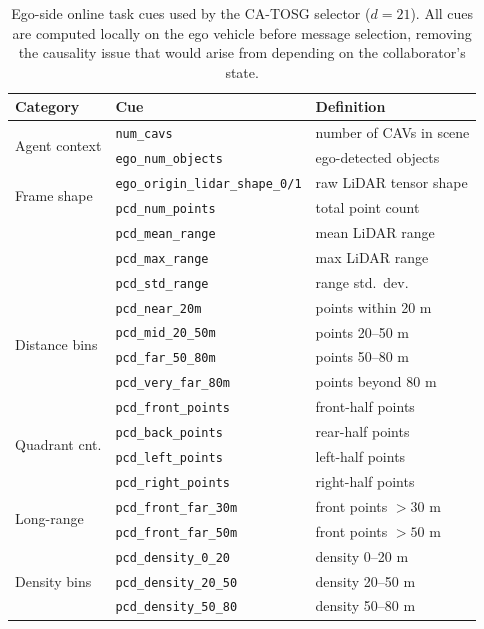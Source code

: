 \documentclass[journal]{IEEEtran}
\newcommand{\method}{CA-TOSG}
\begin{document}
\begin{table}[t]
\centering
\caption{Ego-side online task cues used by the \method{} selector ($d=21$). All cues are computed locally on the ego vehicle before message selection, removing the causality issue that would arise from depending on the collaborator's state.}
\label{tab:cues}
\begin{tabular}{lll}
\toprule
Category & Cue & Definition \\
\midrule
\multirow{2}{*}{Agent context} & \texttt{num\_cavs} & number of CAVs in scene \\
                               & \texttt{ego\_num\_objects} & ego-detected objects \\
\midrule
\multirow{2}{*}{Frame shape}   & \texttt{ego\_origin\_lidar\_shape\_0/1} & raw LiDAR tensor shape \\
\midrule
\multirow{4}{*}{Range stats}   & \texttt{pcd\_num\_points} & total point count \\
                               & \texttt{pcd\_mean\_range}    & mean LiDAR range \\
                               & \texttt{pcd\_max\_range}     & max LiDAR range \\
                               & \texttt{pcd\_std\_range}     & range std.\ dev. \\
\midrule
\multirow{4}{*}{Distance bins} & \texttt{pcd\_near\_20m}      & points within 20 m \\
                               & \texttt{pcd\_mid\_20\_50m}   & points 20--50 m \\
                               & \texttt{pcd\_far\_50\_80m}   & points 50--80 m \\
                               & \texttt{pcd\_very\_far\_80m} & points beyond 80 m \\
\midrule
\multirow{4}{*}{Quadrant cnt.} & \texttt{pcd\_front\_points}  & front-half points \\
                               & \texttt{pcd\_back\_points}   & rear-half points \\
                               & \texttt{pcd\_left\_points}   & left-half points \\
                               & \texttt{pcd\_right\_points}  & right-half points \\
\midrule
\multirow{2}{*}{Long-range}    & \texttt{pcd\_front\_far\_30m} & front points $>30$ m \\
                               & \texttt{pcd\_front\_far\_50m} & front points $>50$ m \\
\midrule
\multirow{3}{*}{Density bins}  & \texttt{pcd\_density\_0\_20}    & density 0--20 m \\
                               & \texttt{pcd\_density\_20\_50}   & density 20--50 m \\
                               & \texttt{pcd\_density\_50\_80}   & density 50--80 m \\
\bottomrule
\end{tabular}
\end{table}
\end{document}
